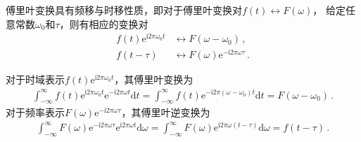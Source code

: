 \begin{theorem}\label{theorem:7.ex01.4}
    傅里叶变换具有频移与时移性质，即对于傅里叶变换对$f(t)\leftrightarrow F(\omega)$，
    给定任意常数$\omega_0$和$\tau$，则有相应的变换对
    \begin{align}
        f(t)\mathrm{e}^{\mathrm{i}2\pi\omega_0 t} & \leftrightarrow F(\omega-\omega_0)\, ,                              \\
        f(t-\tau)                                 & \leftrightarrow F(\omega)\mathrm{e}^{-\mathrm{i}2\pi\omega\tau}\, .
    \end{align}
\end{theorem}
\begin{prove}
    对于时域表示$f(t)\mathrm{e}^{\mathrm{i}2\pi\omega_0 t}$，其傅里叶变换为
    \begin{align}
        \int_{-\infty}^{\infty}f(t)\mathrm{e}^{\mathrm{i}2\pi\omega_0 t}\mathrm{e}^{-\mathrm{i}2\pi\omega t}\mathrm{d}t
        =\int_{-\infty}^{\infty}f(t)\mathrm{e}^{-\mathrm{i}2\pi(\omega-\omega_0) t}\mathrm{d}t=F(\omega-\omega_0)\, .
    \end{align}
    对于频率表示$F(\omega)\mathrm{e}^{-\mathrm{i}2\pi\omega\tau}$，其傅里叶逆变换为
    \begin{align}
        \int_{-\infty}^{\infty}F(\omega)\mathrm{e}^{-\mathrm{i}2\pi\omega\tau}\mathrm{e}^{\mathrm{i}2\pi\omega t}\mathrm{d}\omega
        =\int_{-\infty}^{\infty}F(\omega)\mathrm{e}^{\mathrm{i}2\pi\omega(t-\tau)}\mathrm{d}\omega
        =f(t-\tau)\, .
    \end{align}
\end{prove}

